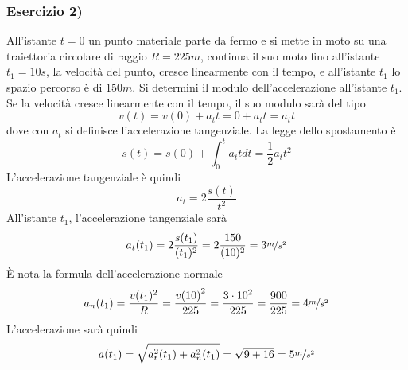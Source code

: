 \documentclass[10pt, letterpaper]{report}
\begin{document}
\subsubsection{Esercizio 2)}
All'istante $t=0$ un punto materiale parte da fermo e si mette in moto su una traiettoria circolare 
di raggio $R=225m$, continua il suo moto fino all'istante $t_1=10s$, la velocità del punto, cresce 
linearmente con il tempo, e all'istante $t_1$ lo spazio percorso è di $150m$. Si determini il modulo dell'accelerazione 
all'istante $t_1$.\\ 
Se la velocità cresce linearmente con il tempo, il suo modulo sarà del tipo 
$$ v(t)=v(0)+a_tt=0+a_tt=a_tt$$
dove con $a_t$ si definisce l'accelerazione tangenziale. La legge dello spostamento  è 
$$s(t)=s(0)+\int_0^ta_ttdt=\frac{1}{2}a_tt^2$$
L'accelerazione tangenziale è quindi 
$$ a_t=2\frac{s(t)}{t^2}$$
All'istante $t_1$, l'accelerazione tangenziale sarà 
$$a_t(t_1) = 2\frac{s(t_1)}{(t_1)^2}=2\frac{150}{(10)^2}=3\nicefrac{m}{s^2}$$
È nota la formula dell'accelerazione normale 
$$ a_n(t_1)=\frac{v(t_1)^2}{R}=\frac{{v(10)}^2}{225}=\frac{{3\cdot 10}^2}{225}=\frac{900}{225}=4\nicefrac{m}{s^2}$$
L'accelerazione sarà quindi 
$$a(t_1)=\sqrt{a_t^2(t_1)+a_n^2(t_1)}=\sqrt{9+16}=5\nicefrac{m}{s^2}$$ 
\end{document}
